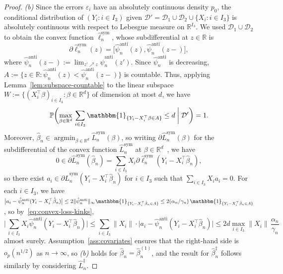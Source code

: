 \documentclass[a4paper]{article}
\newcommand{\R}{\mathbb{R}}
\renewcommand{\Pr}{\mathbb{P}}
\newcommand{\Ind}{\mathbbm{1}}
\newcommand{\norm}[1]{\|{#1}\|}
\DeclareMathOperator*{\argmin}{argmin}
\theoremstyle{definition}
\begin{document}
\begin{proof}
\medskip
\noindent
\textit{(b)} Since the errors $\varepsilon_i$ have an absolutely continuous density $p_0$, the conditional distribution of $(Y_i : i \in I_3)$ given $\mathcal{D}' = \mathcal{D}_1 \cup \mathcal{D}_2 \cup \{X_i : i \in I_3\}$ is absolutely continuous with respect to Lebesgue measure on $\R^{I_3}$. We used $\mathcal{D}_1 \cup \mathcal{D}_2$ to obtain the convex function $\hat{\ell}_n^{\mathrm{sym}}$, whose subdifferential at $z \in \R$ is
\[
\partial\hat{\ell}_n^{\mathrm{sym}}(z) = \bigl[\hat{\psi}_n^{\mathrm{anti}}(z),\hat{\psi}_n^{\mathrm{anti}}(z-)\bigr],
\]
where $\hat{\psi}_n^{\mathrm{anti}}(z-) := \lim_{z' \nearrow z}\hat{\psi}_n^{\mathrm{anti}}(z')$. Since $\hat{\psi}_n^{\mathrm{anti}}$ is decreasing, $A := \bigl\{z \in \R : \hat{\psi}_n^{\mathrm{anti}}(z) < \hat{\psi}_n^{\mathrm{anti}}(z-)\bigr\}$ is countable. Thus, applying Lemma~\ref{lem:subspace-countable} to the linear subspace $W := \bigl\{(X_i^\top\beta)_{i \in I_3} : \beta \in \R^d\bigr\}$ of dimension at most $d$, we have
\begin{equation}
\label{eq:convex-loss-kinks}
\Pr\biggl(\max_{\beta \in \R^d}\,\sum_{i \in I_3} \Ind_{\{Y_i - X_i^\top\beta \in A\}} \leq d \biggm| \mathcal{D}'\biggr) = 1.
\end{equation}
Moreover, $\hat{\beta}_n \in \argmin_{\beta \in \R^d}\hat{L}_n^{\mathrm{sym}}(\beta)$, so writing $\partial\hat{L}_n^{\mathrm{sym}}(\beta)$ for the subdifferential of the convex function $\hat{L}_n^{\mathrm{sym}}$ at $\beta \in \R^d$~\citep[p.~315]{rockafellar97convex}, we have
\[
0 \in \partial\hat{L}_n^{\mathrm{sym}}(\hat{\beta}_n) = \sum_{i \in I_3} X_i\partial\hat{\ell}_n^{\mathrm{sym}}(Y_i - X_i^\top\hat{\beta}_n),
\]
so there exist $a_i \in \partial\hat{L}_n^{\mathrm{sym}}(Y_i - X_i^\top\hat{\beta}_n)$ for $i \in I_3$ such that $\sum_{i \in I_3} X_i a_i = 0$. For each $i \in I_3$, we have $\bigl|a_i - \hat{\psi}_n^{\mathrm{anti}}(Y_i - X_i^\top \hat{\beta}_n)\bigr| \leq 2\norm{\hat{\psi}_n^{\mathrm{anti}}}_\infty \Ind_{\{Y_i - X_i^\top\hat{\beta}_n \in A\}} \leq 2(\alpha_n/\gamma_n)\,\Ind_{\{Y_i - X_i^\top\hat{\beta}_n \in A\}}$, so by~\eqref{eq:convex-loss-kinks},
\[
\Biggl|\,\sum_{i \in I_3}X_i\hat{\psi}_n^{\mathrm{anti}}(Y_i - X_i^\top\hat{\beta}_n)\Biggr| \leq \sum_{i \in I_3}\norm{X_i} \cdot \bigl|a_i - \hat{\psi}_n^{\mathrm{anti}}(Y_i - X_i^\top\hat{\beta}_n)\bigr| \leq 2d\max_{i \in I_3}\norm{X_i}\,\frac{\alpha_n}{\gamma_n}
\]
almost surely.  Assumption~\ref{ass:covariates} ensures that the right-hand side is $o_p(n^{1/2})$ as $n \to \infty$, so \textit{(b)} holds for $\hat{\beta}_n = \hat{\beta}_n^{(1)}$, and the result for $\hat{\beta}_n^\ddagger$ follows similarly by considering $\hat{L}_n^\ddagger$. 
\end{proof}
\end{document}
